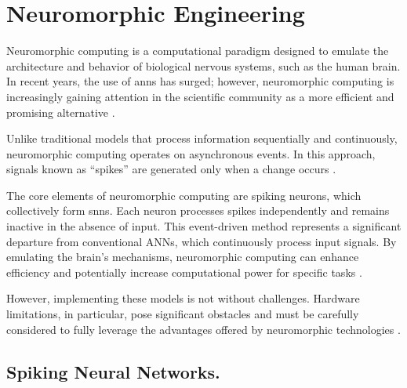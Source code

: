 \section{Neuromorphic Engineering}

Neuromorphic computing is a computational paradigm designed to emulate the architecture and behavior of biological nervous systems, such as the human brain. In recent years, the use of \glspl{ann} has surged; however, neuromorphic computing is increasingly gaining attention in the scientific community as a more efficient and promising alternative \cite{Pritchard2023}.

Unlike traditional models that process information sequentially and continuously, neuromorphic computing operates on asynchronous events. In this approach, signals known as ``spikes'' are generated only when a change occurs \cite{Wu2024}.

The core elements of neuromorphic computing are spiking neurons, which collectively form \glspl{snn}. Each neuron processes spikes independently and remains inactive in the absence of input. This event-driven method represents a significant departure from conventional ANNs, which continuously process input signals. By emulating the brain's mechanisms, neuromorphic computing can enhance efficiency and potentially increase computational power for specific tasks \cite{Wu2024}.

However, implementing these models is not without challenges. Hardware limitations, in particular, pose significant obstacles and must be carefully considered to fully leverage the advantages offered by neuromorphic technologies \cite{Pritchard2023}.

\subsection{Spiking Neural Networks.}


